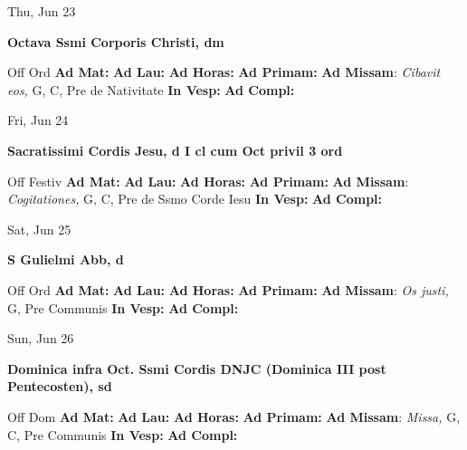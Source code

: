 \documentclass[10pt]{article}
\begin{document}
\begin{minipage}{3.5in}
\vspace{2em}\begin{center}
Thu, Jun 23
\end{center}\textbf{ \large Octava Ssmi Corporis Christi, \textnormal{\normalsize dm}}
\begin{justify}
Off Ord
\textbf{Ad Mat: }
\textbf{Ad Lau: }
\textbf{Ad Horas: }
\textbf{Ad Primam: }
\textbf{Ad Missam}: \textit{Cibavit eos,} G, C, Pre de Nativitate
\textbf{In Vesp: }
\textbf{Ad Compl: }\end{justify}
\end{minipage}



\begin{minipage}{3.5in}
\vspace{2em}\begin{center}
Fri, Jun 24
\end{center}\textbf{ \large Sacratissimi Cordis Jesu, \textnormal{\normalsize d I cl cum Oct privil 3 ord}}
\begin{justify}
Off Festiv
\textbf{Ad Mat: }
\textbf{Ad Lau: }
\textbf{Ad Horas: }
\textbf{Ad Primam: }
\textbf{Ad Missam}: \textit{Cogitationes,} G, C, Pre de Ssmo Corde Iesu
\textbf{In Vesp: }
\textbf{Ad Compl: }\end{justify}
\end{minipage}



\begin{minipage}{3.5in}
\vspace{2em}\begin{center}
Sat, Jun 25
\end{center}\textbf{ \large S Gulielmi Abb, \textnormal{\normalsize d}}
\begin{justify}
Off Ord
\textbf{Ad Mat: }
\textbf{Ad Lau: }
\textbf{Ad Horas: }
\textbf{Ad Primam: }
\textbf{Ad Missam}: \textit{Os justi,} G, Pre Communis
\textbf{In Vesp: }
\textbf{Ad Compl: }\end{justify}
\end{minipage}



\begin{minipage}{3.5in}
\vspace{2em}\begin{center}
Sun, Jun 26
\end{center}\textbf{ \large Dominica infra Oct. Ssmi Cordis DNJC (Dominica III post Pentecosten), \textnormal{\normalsize sd}}
\begin{justify}
Off Dom
\textbf{Ad Mat: }
\textbf{Ad Lau: }
\textbf{Ad Horas: }
\textbf{Ad Primam: }
\textbf{Ad Missam}: \textit{Missa,} G, C, Pre Communis
\textbf{In Vesp: }
\textbf{Ad Compl: }\end{justify}
\end{minipage}
\end{document}
